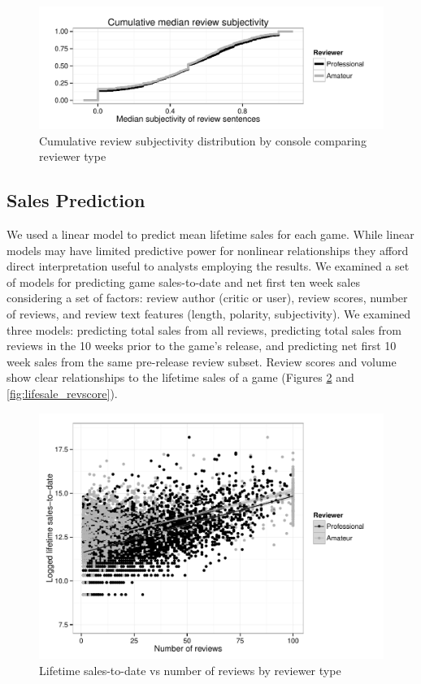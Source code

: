 \documentclass[letterpaper]{article}
\begin{document}
\begin{figure}[tb]
\centering
\includegraphics[width=\linewidth]{./console_reviews_subjectivity_ecdf}
\caption{Cumulative review subjectivity distribution by console comparing reviewer type}
\label{fig:revsubj_density}
\end{figure}



\subsection{Sales Prediction}
We used a linear model to predict mean lifetime sales for each game. While linear models may have limited predictive power for nonlinear relationships they afford direct interpretation useful to analysts employing the results. We examined a set of models for predicting game sales-to-date and net first ten week sales considering a set of factors: review author (critic or user), review scores, number of reviews, and review text features (length, polarity, subjectivity). We examined three models: predicting total sales from all reviews, predicting total sales from reviews in the 10 weeks prior to the game's release, and predicting net first 10 week sales from the same pre-release review subset. Review scores and volume show clear relationships to the lifetime sales of a game (Figures \ref{fig:lifesale_revnum} and \ref{fig:lifesale_revscore}).

\begin{figure}[tbph]
\centering
\includegraphics[width=\linewidth]{./sales_numscore_total}
\caption{Lifetime sales-to-date vs number of reviews by reviewer type}
\label{fig:lifesale_revnum}
\end{figure}
\end{document}
